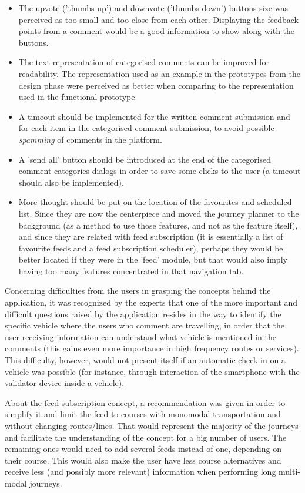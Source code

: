 \begin{itemize}
\item The upvote ('thumbs up') and downvote ('thumbs down') buttons size was perceived as too small and too close from each other. Displaying the feedback points from a comment would be a good information to show along with the buttons.

\item The text representation of categorised comments can be improved for readability. The representation used as an example in the prototypes from the design phase were perceived as better when comparing to the representation used in the functional prototype.

\item A timeout should be implemented for the written comment submission and for each item in the categorised comment submission, to avoid possible \emph{spamming} of comments in the platform.

\item A 'send all' button should be introduced at the end of the categorised comment categories dialogs in order to save some clicks to the user (a timeout should also be implemented).

\item More thought should be put on the location of the favourites and scheduled list. Since they are now the centerpiece and moved the journey planner to the background (as a method to use those features, and not as the feature itself), and since they are related with feed subscription (it is essentially a list of favourite feeds and a feed subscription scheduler), perhaps they would be better located if they were in the 'feed' module, but that would also imply having too many features concentrated in that navigation tab.
\end{itemize}

Concerning difficulties from the users in grasping the concepts behind the application, it was recognized by the experts that one of the more important and difficult questions raised by the application resides in the way to identify the specific vehicle where the users who comment are travelling, in order that the user receiving information can understand what vehicle is mentioned in the comments (this gains even more importance in high frequency routes or services). This difficulty, however, would not present itself if an automatic check-in on a vehicle was possible (for instance, through interaction of the smartphone with the validator device inside a vehicle). 


About the feed subscription concept, a recommendation was given in order to simplify it and limit the feed to courses with monomodal transportation and without changing routes/lines. That would represent the majority of the journeys and facilitate the understanding of the concept for a big number of users. The remaining ones would need to add several feeds instead of one, depending on their course. This would also make the user have less course alternatives and receive less (and possibly more relevant) information when performing long multi-modal journeys.

